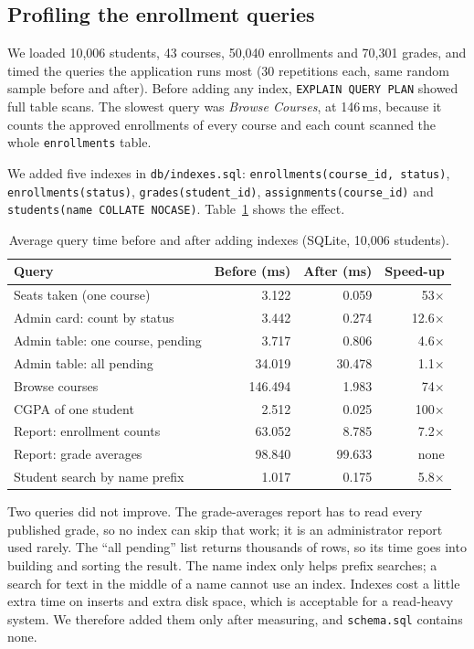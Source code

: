 \subsection{Profiling the enrollment queries}
We loaded 10{,}006 students, 43 courses, 50{,}040 enrollments and 70{,}301 grades, and timed the queries the
application runs most (30 repetitions each, same random sample before and after). Before adding any index,
\texttt{EXPLAIN QUERY PLAN} showed full table scans. The slowest query was \emph{Browse Courses}, at
146\,ms, because it counts the approved enrollments of every course and each count scanned the whole
\texttt{enrollments} table.

We added five indexes in \texttt{db/indexes.sql}: \texttt{enrollments(course\_id, status)},
\texttt{enrollments(status)}, \texttt{grades(student\_id)}, \texttt{assignments(course\_id)} and
\texttt{students(name COLLATE NOCASE)}. Table~\ref{tab:prof} shows the effect.

\begin{table}[h]
\centering
\begin{tabular}{|l|r|r|r|}
\hline
Query & Before (ms) & After (ms) & Speed-up \\
\hline
Seats taken (one course)        & 3.122   & 0.059  & 53$\times$ \\
Admin card: count by status     & 3.442   & 0.274  & 12.6$\times$ \\
Admin table: one course, pending & 3.717  & 0.806  & 4.6$\times$ \\
Admin table: all pending        & 34.019  & 30.478 & 1.1$\times$ \\
Browse courses                  & 146.494 & 1.983  & 74$\times$ \\
CGPA of one student             & 2.512   & 0.025  & 100$\times$ \\
Report: enrollment counts       & 63.052  & 8.785  & 7.2$\times$ \\
Report: grade averages          & 98.840  & 99.633 & none \\
Student search by name prefix   & 1.017   & 0.175  & 5.8$\times$ \\
\hline
\end{tabular}
\caption{Average query time before and after adding indexes (SQLite, 10{,}006 students).}
\label{tab:prof}
\end{table}

Two queries did not improve. The grade-averages report has to read every published grade, so no index can
skip that work; it is an administrator report used rarely. The ``all pending'' list returns thousands of
rows, so its time goes into building and sorting the result. The name index only helps prefix searches;
a search for text in the middle of a name cannot use an index. Indexes cost a little extra time on inserts
and extra disk space, which is acceptable for a read-heavy system. We therefore added them only after
measuring, and \texttt{schema.sql} contains none.
